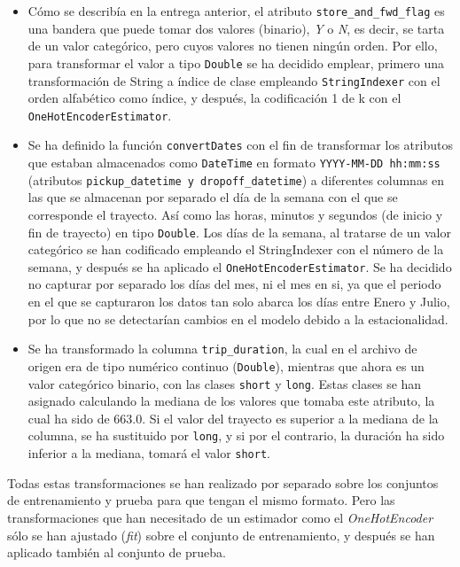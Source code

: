 \documentclass[12pt]{article}
\begin{document}
\begin{itemize}
    \item Cómo se describía en la entrega anterior, el atributo \texttt{store\_and\_fwd\_flag} es una bandera que puede tomar dos valores (binario), \textit{Y} o \textit{N}, es decir, se tarta de un valor categórico, pero cuyos valores no tienen ningún orden. Por ello, para transformar el valor a tipo \texttt{Double} se ha decidido emplear, primero una transformación de String a índice de clase empleando \texttt{StringIndexer} con el orden alfabético como índice, y después, la codificación 1 de k con el \texttt{OneHotEncoderEstimator}.
    \item Se ha definido la función \texttt{convertDates} con el fin de transformar los atributos que estaban almacenados como \texttt{DateTime} en formato \texttt{YYYY-MM-DD hh:mm:ss} (atributos \texttt{pickup\_datetime y dropoff\_datetime}) a diferentes columnas en las que se almacenan por separado el día de la semana con el que se corresponde el trayecto. Así como las horas, minutos y segundos (de inicio y fin de trayecto) en tipo \texttt{Double}. Los días de la semana, al tratarse de un valor categórico se han codificado empleando el StringIndexer con el número de la semana, y después se ha aplicado el \texttt{OneHotEncoderEstimator}. Se ha decidido no capturar por separado los días del mes, ni el mes en si, ya que el periodo en el que se capturaron los datos tan solo abarca los días entre Enero y Julio, por lo que no se detectarían cambios en el modelo debido a la estacionalidad.
    \item Se ha transformado la columna \texttt{trip\_duration}, la cual en el archivo de origen era de tipo numérico continuo (\texttt{Double}), mientras que ahora es un valor categórico binario, con las clases \texttt{short} y \texttt{long}. Estas clases se han asignado calculando la mediana de los valores que tomaba este atributo, la cual ha sido de $663.0$. Si el valor del trayecto es superior a la mediana de la columna, se ha sustituido por \texttt{long}, y si por el contrario, la duración ha sido inferior a la mediana, tomará el valor \texttt{short}.
\end{itemize}

Todas estas transformaciones se han realizado por separado sobre los conjuntos de entrenamiento y prueba para que tengan el mismo formato. Pero las transformaciones que han necesitado de un estimador como el \textit{OneHotEncoder} sólo se han ajustado (\textit{fit}) sobre el conjunto de entrenamiento, y después se han aplicado también al conjunto de prueba.
\end{document}
